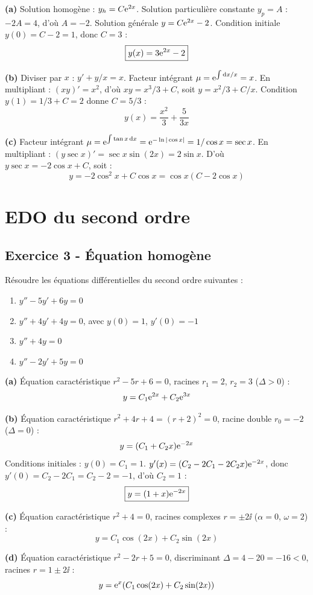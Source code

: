 \documentclass[12pt,a4paper]{article}
\begin{document}
\begin{boitecorrige}
\textbf{(a)} Solution homogène : $y_h = C\mathrm{e}^{2x}$. Solution particulière constante $y_p = A$ : $-2A = 4$, d'où $A = -2$. Solution générale $y = C\mathrm{e}^{2x} - 2$. Condition initiale $y(0) = C - 2 = 1$, donc $C = 3$ :
\[
\boxed{y(x) = 3\mathrm{e}^{2x} - 2}
\]

\textbf{(b)} Diviser par $x$ : $y' + y/x = x$. Facteur intégrant $\mu = \mathrm{e}^{\int \mathrm{d} x/x} = x$. En multipliant : $(xy)' = x^2$, d'où $xy = x^3/3 + C$, soit $y = x^2/3 + C/x$. Condition $y(1) = 1/3 + C = 2$ donne $C = 5/3$ :
\[
\boxed{y(x) = \frac{x^2}{3} + \frac{5}{3x}}
\]

\textbf{(c)} Facteur intégrant $\mu = \mathrm{e}^{\int\tan x\,\mathrm{d} x} = \mathrm{e}^{-\ln|\cos x|} = 1/\cos x = \sec x$. En multipliant : $(y\sec x)' = \sec x\sin(2x) = 2\sin x$. D'où $y\sec x = -2\cos x + C$, soit :
\[
\boxed{y = -2\cos^2 x + C\cos x = \cos x(C - 2\cos x)}
\]
\end{boitecorrige}

\section{EDO du second ordre}

\subsection*{Exercice 3 - Équation homogène \niveau{\moyen}}

\begin{boiteexercice}
Résoudre les équations différentielles du second ordre suivantes :
\begin{enumerate}[label=(\alph*)]
  \item $y'' - 5y' + 6y = 0$
  \item $y'' + 4y' + 4y = 0$, avec $y(0) = 1$, $y'(0) = -1$
  \item $y'' + 4y = 0$
  \item $y'' - 2y' + 5y = 0$
\end{enumerate}
\end{boiteexercice}

\begin{boitecorrige}
\textbf{(a)} Équation caractéristique $r^2 - 5r + 6 = 0$, racines $r_1 = 2$, $r_2 = 3$ ($\Delta > 0$) :
\[
y = C_1\mathrm{e}^{2x} + C_2\mathrm{e}^{3x}
\]

\textbf{(b)} Équation caractéristique $r^2 + 4r + 4 = (r+2)^2 = 0$, racine double $r_0 = -2$ ($\Delta = 0$) :
\[
y = (C_1 + C_2 x)\mathrm{e}^{-2x}
\]
Conditions initiales : $y(0) = C_1 = 1$. $y'(x) = (C_2 - 2C_1 - 2C_2 x)\mathrm{e}^{-2x}$, donc $y'(0) = C_2 - 2C_1 = C_2 - 2 = -1$, d'où $C_2 = 1$ :
\[
\boxed{y = (1+x)\mathrm{e}^{-2x}}
\]

\textbf{(c)} Équation caractéristique $r^2 + 4 = 0$, racines complexes $r = \pm2\ii$ ($\alpha=0$, $\omega=2$) :
\[
y = C_1\cos(2x) + C_2\sin(2x)
\]

\textbf{(d)} Équation caractéristique $r^2 - 2r + 5 = 0$, discriminant $\Delta = 4 - 20 = -16 < 0$, racines $r = 1\pm2\ii$ :
\[
y = \mathrm{e}^x(C_1\cos(2x) + C_2\sin(2x))
\]
\end{boitecorrige}
\end{document}
